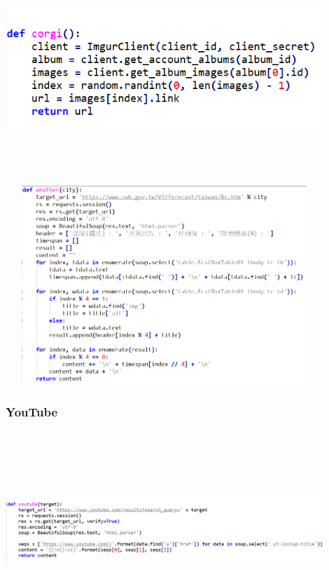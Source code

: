 \documentclass{beamer}
\begin{document}
\begin{CJK}{UTF8}{bkai}
\begin{frame}%
\frametitle{}
\includegraphics[width=12cm,height=7.5cm]{corgi.png} 
\titlepage
\end{frame}

\begin{frame}%
\frametitle{}
\includegraphics[width=12cm,height=7.5cm]{weather.png} 
\titlepage
\end{frame}

\begin{frame}%
\frametitle{\Huge YouTube}
\includegraphics[width=12cm,height=7.5cm]{youtube.png} 
\titlepage
\end{frame}


\end{CJK}
\end{document}

